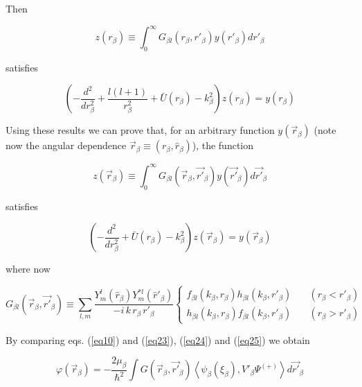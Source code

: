 \documentclass[a4paper,14pt]{book}
\begin{document}
Then

 \begin{equation}\label{eq21}
z(r_ \beta) \equiv \int _0^\infty G_{\beta l} ( r_ \beta, r'_ \beta) y(r'_ \beta) dr'_ \beta
\end{equation}

satisfies

\begin{equation}\label{eq22}
\left( -\frac{d^2}{dr^2_\beta}+\frac{l(l+1)}{r^2_\beta}+\bar U (r_ \beta)-k_\beta^2\right) z(r_ \beta)= y(r_ \beta)
\end{equation}


Using these results we can prove that, for an arbitrary function $y(\vec r_ \beta)$ (note now the angular dependence $\vec r_ \beta \equiv (r_ \beta ,\hat r_ \beta )$), the function


 \begin{equation}\label{eq23}
z(\vec r_ \beta) \equiv \int _0^\infty G_{\beta l} (\vec r_ \beta,\vec {r'}_ \beta) y(\vec {r'}_ \beta) d\vec {r'}_ \beta
\end{equation}


satisfies

\begin{equation}\label{eq24}
\left( -\frac{d^2}{dr^2_\beta}+\bar U (r_ \beta)-k_\beta^2\right) z(\vec r_ \beta)= y(\vec r_ \beta)
\end{equation}


where now


 \begin{equation}\label{eq25}
G_{\beta l} (\vec r_ \beta,\vec {r'}_ \beta) \equiv \sum_{l,m} \frac{Y_m^l(\hat r_ \beta)Y_m^{*l}(\hat r'_ \beta)}
{-i\, k \,r_ \beta\, r'_ \beta}
\left \lbrace \begin{aligned}
f_{\beta l}( k_ \beta, r_ \beta) h_{\beta l}( k_ \beta, r'_ \beta) &\quad( r_ \beta< r'_ \beta)\\
h_{\beta l}( k_ \beta, r_ \beta) f_{\beta l}( k_ \beta, r'_ \beta) &\quad( r_ \beta>r'_ \beta)
\end{aligned}
\right.
\end{equation}

By comparing eqs. (\ref{eq10}) and (\ref{eq23}), (\ref{eq24}) and (\ref{eq25}) we obtain

\begin{equation}\label{eq26}
\varphi(\vec r_ \beta)=-\frac{2 \mu_\beta}{\hbar^2} \int G (\vec r_ \beta,\vec {r'}_ \beta)\left\langle
\psi_\beta (\xi_\beta),V'_\beta \Psi^{(+)}\right\rangle  d\vec {r'}_ \beta
\end{equation}
\end{document}
